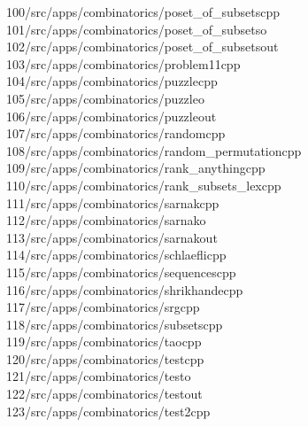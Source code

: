 \begin{tabbing}
100\>/src/apps/combinatorics/poset\_of\_subsetscpp\\[0pt]
101\>/src/apps/combinatorics/poset\_of\_subsetso\\[0pt]
102\>/src/apps/combinatorics/poset\_of\_subsetsout\\[0pt]
103\>/src/apps/combinatorics/problem11cpp\\[0pt]
104\>/src/apps/combinatorics/puzzlecpp\\[0pt]
105\>/src/apps/combinatorics/puzzleo\\[0pt]
106\>/src/apps/combinatorics/puzzleout\\[0pt]
107\>/src/apps/combinatorics/randomcpp\\[0pt]
108\>/src/apps/combinatorics/random\_permutationcpp\\[0pt]
109\>/src/apps/combinatorics/rank\_anythingcpp\\[0pt]
110\>/src/apps/combinatorics/rank\_subsets\_lexcpp\\[0pt]
111\>/src/apps/combinatorics/sarnakcpp\\[0pt]
112\>/src/apps/combinatorics/sarnako\\[0pt]
113\>/src/apps/combinatorics/sarnakout\\[0pt]
114\>/src/apps/combinatorics/schlaeflicpp\\[0pt]
115\>/src/apps/combinatorics/sequencescpp\\[0pt]
116\>/src/apps/combinatorics/shrikhandecpp\\[0pt]
117\>/src/apps/combinatorics/srgcpp\\[0pt]
118\>/src/apps/combinatorics/subsetscpp\\[0pt]
119\>/src/apps/combinatorics/taocpp\\[0pt]
120\>/src/apps/combinatorics/testcpp\\[0pt]
121\>/src/apps/combinatorics/testo\\[0pt]
122\>/src/apps/combinatorics/testout\\[0pt]
123\>/src/apps/combinatorics/test2cpp\\[0pt]

\end{tabbing}
